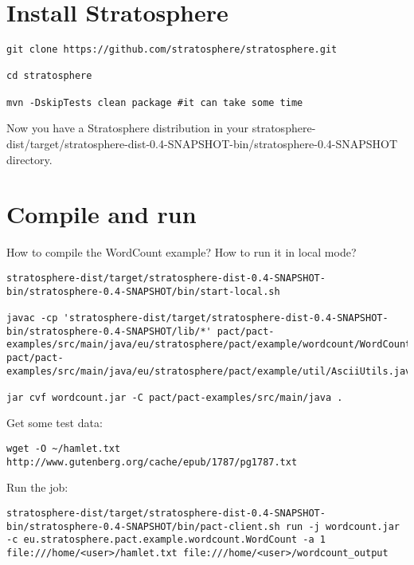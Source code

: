\documentclass[12pt]{article}
\title{\center{Stratosphere hackathon}}
\date{}
\author{}
\begin{document}

\section{Install Stratosphere}

\begin{verbatim}
git clone https://github.com/stratosphere/stratosphere.git

cd stratosphere

mvn -DskipTests clean package #it can take some time
\end{verbatim}

Now you have a Stratosphere distribution in your stratosphere-dist/target/stratosphere-dist-0.4-SNAPSHOT-bin/stratosphere-0.4-SNAPSHOT directory.

\section{Compile and run}

How to compile the WordCount example? How to run it in local mode?

\begin{verbatim}
stratosphere-dist/target/stratosphere-dist-0.4-SNAPSHOT-bin/stratosphere-0.4-SNAPSHOT/bin/start-local.sh

javac -cp 'stratosphere-dist/target/stratosphere-dist-0.4-SNAPSHOT-bin/stratosphere-0.4-SNAPSHOT/lib/*' pact/pact-examples/src/main/java/eu/stratosphere/pact/example/wordcount/WordCount.java pact/pact-examples/src/main/java/eu/stratosphere/pact/example/util/AsciiUtils.java

jar cvf wordcount.jar -C pact/pact-examples/src/main/java .
\end{verbatim}

Get some test data:

\begin{verbatim}
wget -O ~/hamlet.txt http://www.gutenberg.org/cache/epub/1787/pg1787.txt
\end{verbatim}

Run the job:

\begin{verbatim}
stratosphere-dist/target/stratosphere-dist-0.4-SNAPSHOT-bin/stratosphere-0.4-SNAPSHOT/bin/pact-client.sh run -j wordcount.jar -c eu.stratosphere.pact.example.wordcount.WordCount -a 1 file:///home/<user>/hamlet.txt file:///home/<user>/wordcount_output
\end{verbatim}
\end{document}
